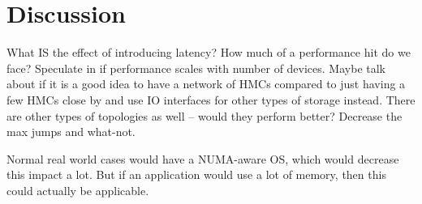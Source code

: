 \chapter{Discussion}
What IS the effect of introducing latency? How much of a performance hit do we face? Speculate in if performance scales with number of devices. Maybe talk about if it is a good idea to have a network of HMCs compared to just having a few HMCs close by and use IO interfaces for other types of storage instead. There are other types of topologies as well -- would they perform better? Decrease the max jumps and what-not.

Normal real world cases would have a NUMA-aware OS, which would decrease this impact a lot. But if an application would use a lot of memory, then this could actually be applicable. 